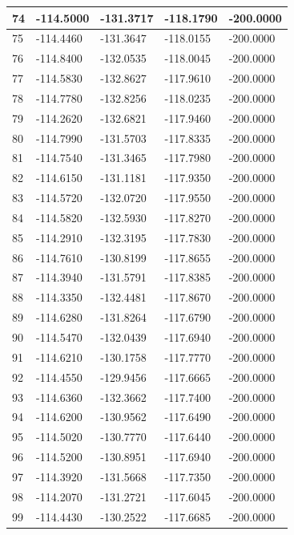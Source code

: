 \begin{longtable}{|l|l|l|l|l|}
74 & -114.5000 & -131.3717 & -118.1790 & -200.0000 \\\hline
75 & -114.4460 & -131.3647 & -118.0155 & -200.0000 \\\hline
76 & -114.8400 & -132.0535 & -118.0045 & -200.0000 \\\hline
77 & -114.5830 & -132.8627 & -117.9610 & -200.0000 \\\hline
78 & -114.7780 & -132.8256 & -118.0235 & -200.0000 \\\hline
79 & -114.2620 & -132.6821 & -117.9460 & -200.0000 \\\hline
80 & -114.7990 & -131.5703 & -117.8335 & -200.0000 \\\hline
81 & -114.7540 & -131.3465 & -117.7980 & -200.0000 \\\hline
82 & -114.6150 & -131.1181 & -117.9350 & -200.0000 \\\hline
83 & -114.5720 & -132.0720 & -117.9550 & -200.0000 \\\hline
84 & -114.5820 & -132.5930 & -117.8270 & -200.0000 \\\hline
85 & -114.2910 & -132.3195 & -117.7830 & -200.0000 \\\hline
86 & -114.7610 & -130.8199 & -117.8655 & -200.0000 \\\hline
87 & -114.3940 & -131.5791 & -117.8385 & -200.0000 \\\hline
88 & -114.3350 & -132.4481 & -117.8670 & -200.0000 \\\hline
89 & -114.6280 & -131.8264 & -117.6790 & -200.0000 \\\hline
90 & -114.5470 & -132.0439 & -117.6940 & -200.0000 \\\hline
91 & -114.6210 & -130.1758 & -117.7770 & -200.0000 \\\hline
92 & -114.4550 & -129.9456 & -117.6665 & -200.0000 \\\hline
93 & -114.6360 & -132.3662 & -117.7400 & -200.0000 \\\hline
94 & -114.6200 & -130.9562 & -117.6490 & -200.0000 \\\hline
95 & -114.5020 & -130.7770 & -117.6440 & -200.0000 \\\hline
96 & -114.5200 & -130.8951 & -117.6940 & -200.0000 \\\hline
97 & -114.3920 & -131.5668 & -117.7350 & -200.0000 \\\hline
98 & -114.2070 & -131.2721 & -117.6045 & -200.0000 \\\hline
99 & -114.4430 & -130.2522 & -117.6685 & -200.0000 \\\hline
\end{longtable}
